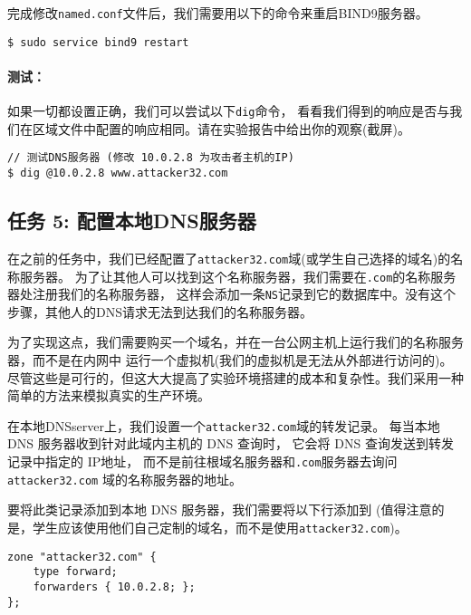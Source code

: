 完成修改\texttt{named.conf}文件后，我们需要用以下的命令来重启BIND9服务器。


\begin{lstlisting}
$ sudo service bind9 restart
\end{lstlisting}
 

\paragraph{测试：} 如果一切都设置正确，我们可以尝试以下\texttt{dig}命令，
看看我们得到的响应是否与我们在区域文件中配置的响应相同。请在实验报告中给出你的观察(截屏)。

\begin{lstlisting}
// 测试DNS服务器 (修改 10.0.2.8 为攻击者主机的IP)
$ dig @10.0.2.8 www.attacker32.com
\end{lstlisting}



\subsection{任务 5: 配置本地DNS服务器}

在之前的任务中，我们已经配置了\texttt{attacker32.com}域(或学生自己选择的域名)的名称服务器。
为了让其他人可以找到这个名称服务器，我们需要在\texttt{.com}的名称服务器处注册我们的名称服务器，
这样会添加一条\texttt{NS}记录到它的数据库中。没有这个步骤，其他人的DNS请求无法到达我们的名称服务器。


为了实现这点，我们需要购买一个域名，并在一台公网主机上运行我们的名称服务器，而不是在内网中
运行一个虚拟机(我们的虚拟机是无法从外部进行访问的)。
尽管这些是可行的，但这大大提高了实验环境搭建的成本和复杂性。我们采用一种简单的方法来模拟真实的生产环境。


在本地DNSserver上，我们设置一个\texttt{attacker32.com}域的转发记录。
每当本地 DNS 服务器收到针对此域内主机的 DNS 查询时，
它会将 DNS 查询发送到转发记录中指定的 IP地址，
而不是前往根域名服务器和\texttt{.com}服务器去询问\texttt{attacker32.com}
域的名称服务器的地址。


要将此类记录添加到本地 DNS 服务器，我们需要将以下行添加到 
(值得注意的是，学生应该使用他们自己定制的域名，而不是使用\texttt{attacker32.com})。


\begin{lstlisting}
zone "attacker32.com" {
    type forward;
    forwarders { 10.0.2.8; };
};
\end{lstlisting}

